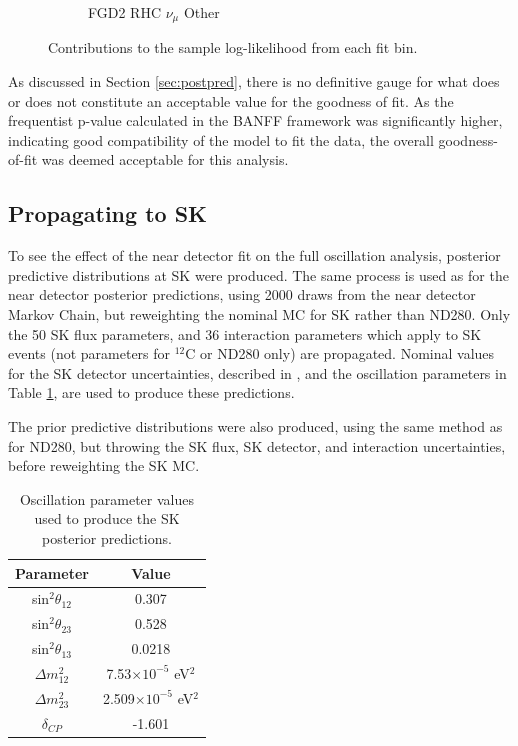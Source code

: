 \begin{figure}
\begin{subfigure}{.32\textwidth}
  \caption{FGD2 RHC $\nu_{\mu}$ Other}
  \label{fig:llhcont_FGD2_NuMuBkg_CCOther_in_AntiNu_Mode}
\end{subfigure}
\caption{Contributions to the sample log-likelihood from each fit bin.}
\label{fig:llhconts}
\end{figure}

As discussed in Section \ref{sec:postpred}, there is no definitive gauge for what does or does not constitute an acceptable value for the goodness of fit. As the frequentist p-value calculated in the BANFF framework was significantly higher\cite{}, indicating good compatibility of the model to fit the data, the overall goodness-of-fit was deemed acceptable for this analysis.

\subsection{Propagating to SK}

To see the effect of the near detector fit on the full oscillation analysis, posterior predictive distributions at SK were produced. The same process is used as for the near detector posterior predictions, using 2000 draws from the near detector Markov Chain, but reweighting the nominal MC for SK rather than ND280. Only the 50 SK flux parameters, and 36 interaction parameters which apply to SK events (not parameters for $^{12}$C or ND280 only) are propagated. Nominal values for the SK detector uncertainties, described in \cite{tn399}, and the oscillation parameters in Table \ref{tab:oscpar}, are used to produce these predictions.

The prior predictive distributions were also produced, using the same method as for ND280, but throwing the SK flux, SK detector, and interaction uncertainties, before reweighting the SK MC.

\begin{center}
\begin{table}
\center
\begin{tabular}{c||c}
\hline \hline
\textbf{Parameter} & \textbf{Value} \\
\hline\hline
sin$^2 \theta_{12}$ & 0.307 \\ 
sin$^2 \theta_{23}$ & 0.528 \\
sin$^2 \theta_{13}$ & 0.0218 \\
$\Delta m^2_{12}$ & 7.53$\times10^{-5}$ eV$^2$\\ 
$\Delta m^2_{23}$ & 2.509$\times10^{-5}$ eV$^2$ \\ 
$\delta_{CP}$ & -1.601 \\ 
\hline \hline
\end{tabular}
\caption{Oscillation parameter values used to produce the SK posterior predictions.}
\label{tab:oscpar}
\end{table}
\end{center}

